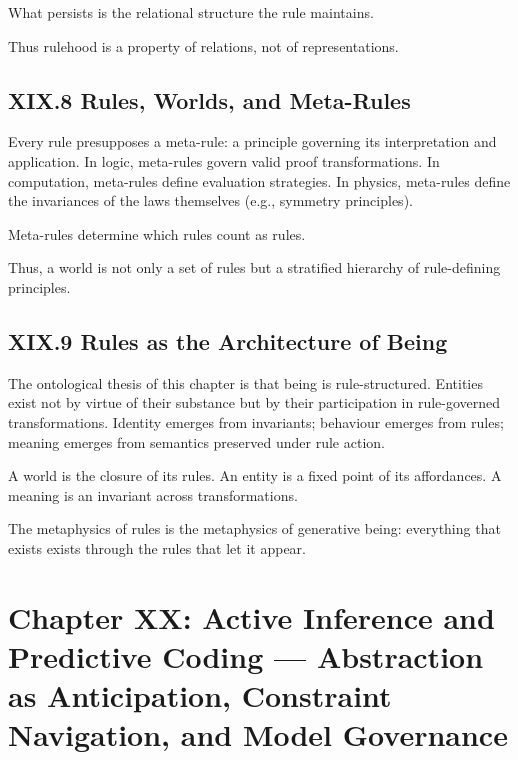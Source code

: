 \documentclass[11pt,letterpaper]{article}
\begin{document}
What persists is the relational structure the rule maintains.

Thus rulehood is a property of relations, not of representations.

\subsection{XIX.8 Rules, Worlds, and Meta-Rules}

Every rule presupposes a meta-rule: a principle governing its interpretation and application. In logic, meta-rules govern valid proof transformations. In computation, meta-rules define evaluation strategies. In physics, meta-rules define the invariances of the laws themselves (e.g., symmetry principles).

Meta-rules determine which rules count as rules.

Thus, a world is not only a set of rules but a stratified hierarchy of rule-defining principles.

\subsection{XIX.9 Rules as the Architecture of Being}

The ontological thesis of this chapter is that being is rule-structured. Entities exist not by virtue of their substance but by their participation in rule-governed transformations. Identity emerges from invariants; behaviour emerges from rules; meaning emerges from semantics preserved under rule action.

A world is the closure of its rules.  
An entity is a fixed point of its affordances.  
A meaning is an invariant across transformations.

The metaphysics of rules is the metaphysics of generative being: everything that exists exists through the rules that let it appear.

\newpage
\section{Chapter XX: Active Inference and Predictive Coding —  
Abstraction as Anticipation, Constraint Navigation, and Model Governance}
\end{document}
